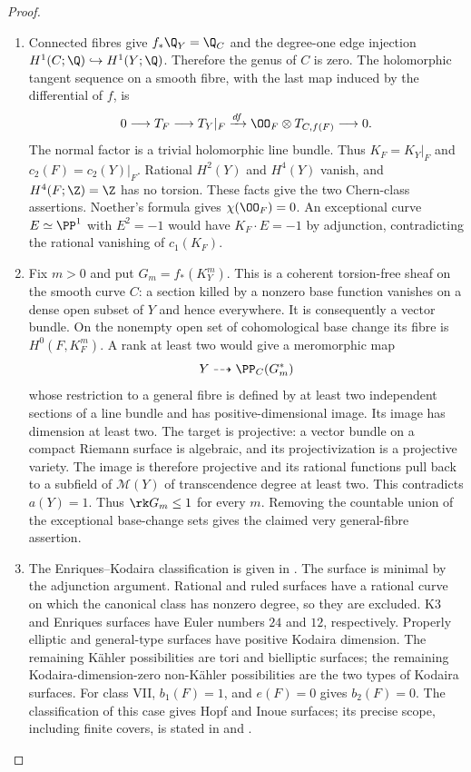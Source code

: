 \begin{proof}

\begin{enumerate}[leftmargin=*]
\item Connected fibres give $f_*\Q_Y=\Q_C$ and the degree-one edge injection
$H^1(C;\Q)\hookrightarrow H^1(Y;\Q)$. Therefore the genus of $C$ is
zero. The holomorphic tangent sequence on a smooth fibre, with the
last map induced by the differential of $f$, is
\[
0\longrightarrow T_F\longrightarrow T_Y|_F
 \xrightarrow{df} \OO_F\otimes T_{C,f(F)}\longrightarrow0.
\]
The normal factor is a trivial holomorphic line bundle. Thus
$K_F=K_Y|_F$ and $c_2(F)=c_2(Y)|_F$. Rational $H^2(Y)$ and $H^4(Y)$
vanish, and $H^4(F;\Z)=\Z$ has no torsion. These facts give the two
Chern-class assertions. Noether's formula gives $\chi(\OO_F)=0$.
An exceptional curve $E\simeq\PP^1$ with $E^2=-1$ would have
$K_F\cdot E=-1$ by adjunction, contradicting the rational vanishing of
$c_1(K_F)$.

\item Fix $m>0$ and put $G_m=f_*(K_Y^m)$. This is a coherent torsion-free
sheaf on the smooth curve $C$: a section killed by a nonzero base
function vanishes on a dense open subset of $Y$ and hence everywhere.
It is consequently a vector bundle. On the nonempty open set of
cohomological base change its fibre is $H^0(F,K_F^m)$. A rank at least
two would give a meromorphic map
\[
 Y\dashrightarrow \PP_C(G_m^*)
\]
whose restriction to a general fibre is defined by at least two
independent sections of a line bundle and has positive-dimensional
image. Its image has dimension at least two. The target is projective:
a vector bundle on a compact Riemann surface is algebraic, and its
projectivization is a projective variety. The image is therefore
projective and its rational functions pull back to a subfield of
$\mathcal M(Y)$ of transcendence degree at least two. This contradicts
$a(Y)=1$. Thus $\rk G_m\leq1$ for every $m$. Removing the countable
union of the exceptional base-change sets gives the claimed very
general-fibre assertion.

\item The Enriques--Kodaira classification is given in
\cite[Theorem 3.1]{Peters1990}. The surface is minimal by the
adjunction argument. Rational and ruled surfaces have a rational
curve on which the canonical class has nonzero degree, so they are
excluded. K3 and Enriques surfaces have Euler numbers $24$ and $12$,
respectively. Properly elliptic and general-type surfaces have
positive Kodaira dimension. The remaining K\"ahler possibilities are
tori and bielliptic surfaces; the remaining Kodaira-dimension-zero
non-K\"ahler possibilities are the two types of Kodaira surfaces.
For class VII, $b_1(F)=1$, and $e(F)=0$ gives $b_2(F)=0$. The
classification of this case gives Hopf and Inoue surfaces; its
precise scope, including finite covers, is stated in
\cite[p.~2]{Teleman2008} and \cite[Theorem 1]{BBK2019}.

\end{enumerate}
\end{proof}